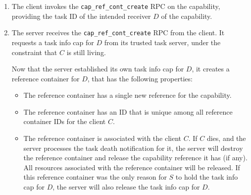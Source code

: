 \begin{enumerate}
\item The client invokes the \verb/cap_ref_cont_create/ RPC on the
  capability, providing the task ID of the intended receiver $D$ of
  the capability.
  
\item The server receives the \verb/cap_ref_cont_create/ RPC from the
  client.  It requests a task info cap for $D$ from its trusted task
  server, under the constraint that $C$ is still living.

  \begin{comment}
    A task can provide a constraint when creating a task info cap in
    the \texttt{task} server.  The constraint is a task ID.  The task
    server will only create the task info cap and return it if the
    task with the constraint task ID is not destroyed.  This allows
    for a task requesting a task info capability to make sure that
    another task, which also holds this task info cap, is not
    destroyed.  This is important, because if a task is destroyed, all
    the task info caps it held are released.

    In this case, the server relies on the client to hold a task info
    cap for $D$ until it established its own.  See below for what can
    go wrong if the server would not provide a constraint and both,
    the client and the destination task would die unexpectedly.
  \end{comment}
  
  Now that the server established its own task info cap for $D$, it
  creates a reference container for $D$, that has the following
  properties:

  \begin{itemize}
  \item The reference container has a single new reference for the
    capability.
    
  \item The reference container has an ID that is unique among all
    reference container IDs for the client $C$.
    
  \item The reference container is associated with the client $C$.  If
    $C$ dies, and the server processes the task death notification for
    it, the server will destroy the reference container and release
    the capability reference it has (if any).  All resources
    associated with the reference container will be released.  If this
    reference container was the only reason for $S$ to hold the task
    info cap for $D$, the server will also release the task info cap
    for $D$.
    

\end{itemize}
\end{enumerate}
